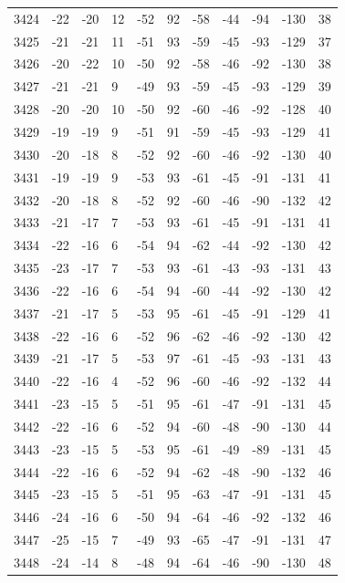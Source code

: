 \begin{table}[H]
\begin{tabular}{lllllllllll}
3424 & -22 & -20 & 12 & -52 & 92 & -58 & -44 & -94 & -130 & 38 \\
3425 & -21 & -21 & 11 & -51 & 93 & -59 & -45 & -93 & -129 & 37 \\
3426 & -20 & -22 & 10 & -50 & 92 & -58 & -46 & -92 & -130 & 38 \\
3427 & -21 & -21 & 9 & -49 & 93 & -59 & -45 & -93 & -129 & 39 \\
3428 & -20 & -20 & 10 & -50 & 92 & -60 & -46 & -92 & -128 & 40 \\
3429 & -19 & -19 & 9 & -51 & 91 & -59 & -45 & -93 & -129 & 41 \\
3430 & -20 & -18 & 8 & -52 & 92 & -60 & -46 & -92 & -130 & 40 \\
3431 & -19 & -19 & 9 & -53 & 93 & -61 & -45 & -91 & -131 & 41 \\
3432 & -20 & -18 & 8 & -52 & 92 & -60 & -46 & -90 & -132 & 42 \\
3433 & -21 & -17 & 7 & -53 & 93 & -61 & -45 & -91 & -131 & 41 \\
3434 & -22 & -16 & 6 & -54 & 94 & -62 & -44 & -92 & -130 & 42 \\
3435 & -23 & -17 & 7 & -53 & 93 & -61 & -43 & -93 & -131 & 43 \\
3436 & -22 & -16 & 6 & -54 & 94 & -60 & -44 & -92 & -130 & 42 \\
3437 & -21 & -17 & 5 & -53 & 95 & -61 & -45 & -91 & -129 & 41 \\
3438 & -22 & -16 & 6 & -52 & 96 & -62 & -46 & -92 & -130 & 42 \\
3439 & -21 & -17 & 5 & -53 & 97 & -61 & -45 & -93 & -131 & 43 \\
3440 & -22 & -16 & 4 & -52 & 96 & -60 & -46 & -92 & -132 & 44 \\
3441 & -23 & -15 & 5 & -51 & 95 & -61 & -47 & -91 & -131 & 45 \\
3442 & -22 & -16 & 6 & -52 & 94 & -60 & -48 & -90 & -130 & 44 \\
3443 & -23 & -15 & 5 & -53 & 95 & -61 & -49 & -89 & -131 & 45 \\
3444 & -22 & -16 & 6 & -52 & 94 & -62 & -48 & -90 & -132 & 46 \\
3445 & -23 & -15 & 5 & -51 & 95 & -63 & -47 & -91 & -131 & 45 \\
3446 & -24 & -16 & 6 & -50 & 94 & -64 & -46 & -92 & -132 & 46 \\
3447 & -25 & -15 & 7 & -49 & 93 & -65 & -47 & -91 & -131 & 47 \\
3448 & -24 & -14 & 8 & -48 & 94 & -64 & -46 & -90 & -130 & 48 \\

\end{tabular}
\end{table}
